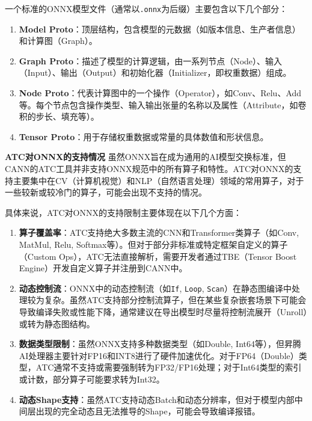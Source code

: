 一个标准的ONNX模型文件（通常以\passthrough{\lstinline!.onnx!}为后缀）主要包含以下几个部分：

\begin{enumerate}
\def\labelenumi{\arabic{enumi}.}
\tightlist
\item
  \textbf{Model
  Proto}：顶层结构，包含模型的元数据（如版本信息、生产者信息）和计算图（Graph）。
\item
  \textbf{Graph
  Proto}：描述了模型的计算逻辑，由一系列节点（Node）、输入（Input）、输出（Output）和初始化器（Initializer，即权重数据）组成。
\item
  \textbf{Node
  Proto}：代表计算图中的一个操作（Operator），如Conv、Relu、Add等。每个节点包含操作类型、输入输出张量的名称以及属性（Attribute，如卷积的步长、填充等）。
\item
  \textbf{Tensor Proto}：用于存储权重数据或常量的具体数值和形状信息。
\end{enumerate}

\textbf{ATC对ONNX的支持情况}
虽然ONNX旨在成为通用的AI模型交换标准，但CANN的ATC工具并非支持ONNX规范中的所有算子和特性。ATC对ONNX的支持主要集中在CV（计算机视觉）和NLP（自然语言处理）领域的常用算子，对于一些较新或较冷门的算子，可能会出现不支持的情况。

具体来说，ATC对ONNX的支持限制主要体现在以下几个方面：

\begin{enumerate}
\def\labelenumi{\arabic{enumi}.}
\tightlist
\item
  \textbf{算子覆盖率}：ATC支持绝大多数主流的CNN和Transformer类算子（如Conv,
  MatMul, Relu,
  Softmax等）。但对于部分非标准或特定框架自定义的算子（Custom
  Ops），ATC无法直接解析，需要开发者通过TBE（Tensor Boost
  Engine）开发自定义算子并注册到CANN中。
\item
  \textbf{动态控制流}：ONNX中的动态控制流（如\passthrough{\lstinline!If!},
  \passthrough{\lstinline!Loop!},
  \passthrough{\lstinline!Scan!}）在静态图编译中处理较为复杂。虽然ATC支持部分控制流算子，但在某些复杂嵌套场景下可能会导致编译失败或性能下降，通常建议在导出模型时尽量将控制流展开（Unroll）或转为静态图结构。
\item
  \textbf{数据类型限制}：虽然ONNX支持多种数据类型（如Double,
  Int64等），但昇腾AI处理器主要针对FP16和INT8进行了硬件加速优化。对于FP64（Double）类型，ATC通常不支持或需要强制转为FP32/FP16处理；对于Int64类型的索引或计数，部分算子可能要求转为Int32。
\item
  \textbf{动态Shape支持}：虽然ATC支持动态Batch和动态分辨率，但对于模型内部中间层出现的完全动态且无法推导的Shape，可能会导致编译报错。
\end{enumerate}

